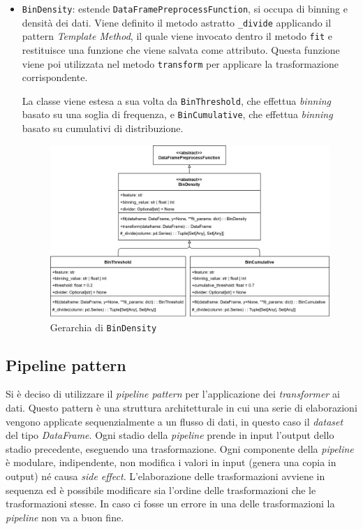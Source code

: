 \begin{itemize}
    \item \texttt{BinDensity}: estende \texttt{DataFramePreprocessFunction}, si occupa di binning e densità dei dati. Viene definito il metodo astratto \texttt{\_divide} applicando il pattern \textit{Template Method}, il quale viene invocato dentro il metodo \texttt{fit} e restituisce una funzione che viene salvata come attributo. Questa funzione viene poi utilizzata nel metodo \texttt{transform} per applicare la trasformazione corrispondente.
    
    La classe viene estesa a sua volta da \texttt{BinThreshold}, che effettua \textit{binning} basato su una soglia di frequenza, e \texttt{BinCumulative}, che effettua \textit{binning} basato su cumulativi di distribuzione.
    \begin{figure}[H]
        \centering
        \includegraphics[scale=0.10]{figures/UML/preprocessing/bin_density.png}
        \caption{Gerarchia di \texttt{BinDensity}}
    \end{figure}
\end{itemize}

\subsection{Pipeline pattern}

Si è deciso di utilizzare il \textit{pipeline pattern} per l'applicazione dei \textit{transformer} ai dati. Questo pattern è una struttura architetturale in cui una serie di elaborazioni vengono applicate sequenzialmente a un flusso di dati, in questo caso il \textit{dataset} del tipo \textit{DataFrame}. Ogni stadio della \textit{pipeline} prende in input l'output dello stadio precedente, eseguendo una trasformazione. Ogni componente della \textit{pipeline} è modulare, indipendente, non modifica i valori in input (genera una copia in output) né causa \textit{side effect}. L'elaborazione delle trasformazioni avviene in sequenza ed è possibile modificare sia l'ordine delle trasformazioni che le trasformazioni stesse. In caso ci fosse un errore in una delle trasformazioni la \textit{pipeline} non va a buon fine.

